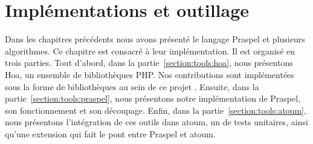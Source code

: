 \chapter{Implémentations et outillage}
\label{chapter:tools}

\minitoc

Dans les chapitres précédents nous avons présenté le langage Praspel et
plusieurs algorithmes. Ce chapitre est consacré à leur implémentation. Il est
organisé en trois parties. Tout d'abord, dans la partie~\ref{section:tools:hoa},
nous présentons Hoa, un ensemble de bibliothèques PHP. Nos contributions sont
implémentées sous la forme de bibliothèques au sein de ce projet
. Ensuite, dans la partie~\ref{section:tools:praspel},
nous présentons notre implémentation de Praspel, son fonctionnement et son
découpage. Enfin, dans la partie~\ref{section:tools:atoum}, nous présentons
l'intégration de ces outils dans atoum, un  de tests
unitaires, ainsi qu'une extension qui fait le pont entre Praspel et atoum.

